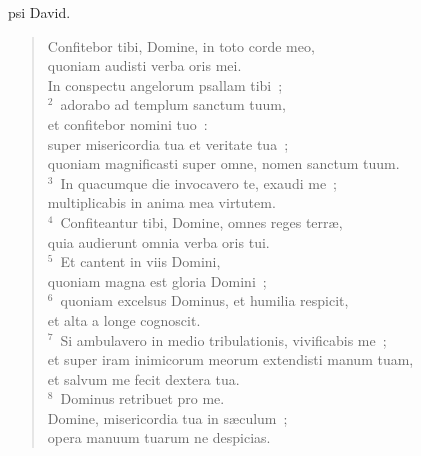\bchapter
{}psi David. \begin{flushleft}\begin{verse}\vspace{6pt}Confitebor tibi, Domine, in toto corde meo,\\ quoniam audisti verba oris mei.\\ In conspectu angelorum psallam tibi~;\\
${}^{2}$~adorabo ad templum sanctum tuum,\\ et confitebor nomini tuo~:\\ super misericordia tua et veritate tua~;\\ quoniam magnificasti super omne, nomen sanctum tuum.\\
${}^{3}$~In quacumque die invocavero te, exaudi me~;\\ multiplicabis in anima mea virtutem.\\
${}^{4}$~Confiteantur tibi, Domine, omnes reges terr\ae ,\\ quia audierunt omnia verba oris tui.\\
${}^{5}$~Et cantent in viis Domini,\\ quoniam magna est gloria Domini~;\\
${}^{6}$~quoniam excelsus Dominus, et humilia respicit,\\ et alta a longe cognoscit.\\
${}^{7}$~Si ambulavero in medio tribulationis, vivificabis me~;\\ et super iram inimicorum meorum extendisti manum tuam,\\ et salvum me fecit dextera tua.\\
${}^{8}$~Dominus retribuet pro me.\\ Domine, misericordia tua in s\ae culum~;\\ opera manuum tuarum ne despicias.\end{verse}\end{flushleft}



